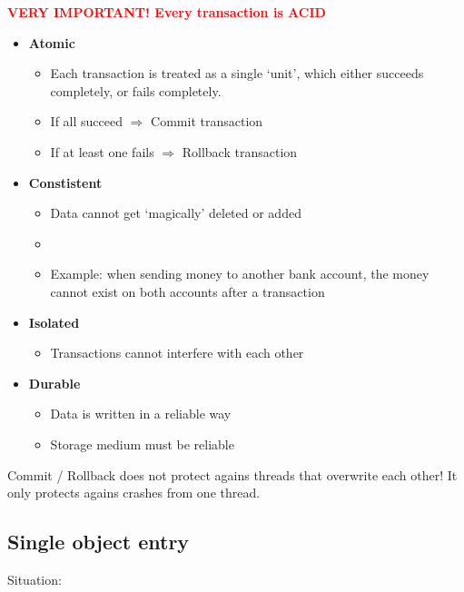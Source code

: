 \documentclass{article}
\begin{document}
\textcolor{red}{\textbf{VERY IMPORTANT! Every transaction is ACID}}

\begin{itemize}
    \item \textbf{Atomic}
    \begin{itemize}
        \item Each transaction is treated as a single `unit', which either succeeds completely, or fails completely.
        \item If all succeed $\Rightarrow$ Commit transaction
        \item If at least one fails $\Rightarrow$ Rollback transaction
    \end{itemize}
    \item \textbf{Constistent}
    \begin{itemize}
        \item Data cannot get `magically' deleted or added
        \item 
        \item Example: when sending money to another bank account, the money cannot exist on both accounts after a transaction
    \end{itemize}
    \item \textbf{Isolated}
    \begin{itemize}
        \item Transactions cannot interfere with each other
    \end{itemize}
    \item \textbf{Durable}
    \begin{itemize}
        \item Data is written in a reliable way 
        \item Storage medium must be reliable
    \end{itemize}
\end{itemize}

Commit / Rollback does not protect agains threads that overwrite each other!
It only protects agains crashes from one thread.

\subsection{Single object entry}

Situation: 
\end{document}
